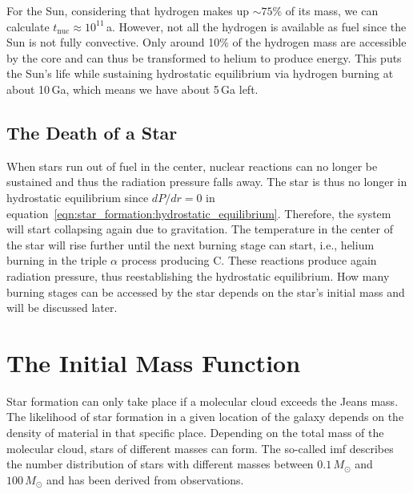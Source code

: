 For the Sun, considering that hydrogen makes up $\sim75$\% of its mass, we can calculate $t_\mathrm{nuc} \approx 10^{11}$\,a. However, not all the hydrogen is available as fuel since the Sun is not fully convective. Only around 10\% of the hydrogen mass are accessible by the core and can thus be transformed to helium to produce energy. This puts the Sun's life while sustaining hydrostatic equilibrium via hydrogen burning at about 10\,Ga, which means we have about 5\,Ga left.


\subsection{The Death of a Star}

When stars run out of fuel in the center, nuclear reactions can no longer be sustained and thus the radiation pressure falls away. The star is thus no longer in hydrostatic equilibrium since $dP/dr = 0$ in equation~\eqref{eqn:star_formation:hydrostatic_equilibrium}. Therefore, the system will start collapsing again due to gravitation. The temperature in the center of the star will rise further until the next burning stage can start, i.e., helium burning in the triple $\alpha$ process producing C. These reactions produce again radiation pressure, thus reestablishing the hydrostatic equilibrium. How many burning stages can be accessed by the star depends on the star's initial mass and will be discussed later. 

    

\section{The Initial Mass Function}\label{sec:star_formation:imf}

Star formation can only take place if a molecular cloud exceeds the Jeans mass. The likelihood of star formation in a given location of the galaxy depends on the density of material in that specific place. Depending on the total mass of the molecular cloud, stars of different masses can form. The so-called \ac{imf} describes the number distribution of stars with different masses between $0.1\,M_\odot$ and $100\,M_\odot$ and has been derived from observations. 

